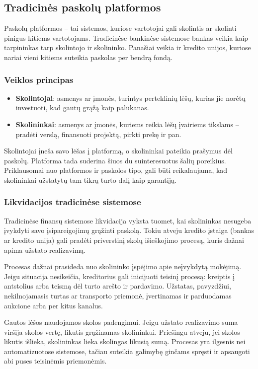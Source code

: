 \documentclass[]{VUMIFTemplateClass}
\begin{document}
\subsection{Tradicinės paskolų platformos}
Paskolų platformos – tai sistemos, kuriose vartotojai gali skolintis ar skolinti pinigus kitiems vartotojams. Tradicinėse bankinėse sistemose bankas veikia kaip tarpininkas tarp skolintojo ir skolininko. Panašiai veikia ir kredito unijos, kuriose nariai vieni kitiems suteikia paskolas per bendrą fondą.

\subsubsection{Veiklos principas}
\begin{itemize}
    \item \textbf{Skolintojai}: asmenys ar įmonės, turintys perteklinių lėšų, kurias jie norėtų investuoti, kad gautų grąžą kaip palūkanas.
    \item \textbf{Skolininkai}: asmenys ar įmonės, kuriems reikia lėšų įvairiems tikslams – pradėti verslą, finansuoti projektą, pirkti prekę ir pan.
\end{itemize}

Skolintojai įneša savo lėšas į platformą, o skolininkai pateikia prašymus dėl paskolų. Platforma tada suderina šiuos du suinteresuotus šalių poreikius. Priklausomai nuo platformos ir paskolos tipo, gali būti reikalaujama, kad skolininkai užstatytų tam tikrą turto dalį kaip garantiją.

\subsubsection{Likvidacijos tradicinėse sistemose}
Tradicinėse finansų sistemose likvidacija vyksta tuomet, kai skolininkas nesugeba įvykdyti savo įsipareigojimų grąžinti paskolą. Tokiu atveju kredito įstaiga (bankas ar kredito unija) gali pradėti priverstinį skolų išieškojimo procesą, kuris dažnai apima užstato realizavimą.

Procesas dažnai prasideda nuo skolininko įspėjimo apie neįvykdytą mokėjimą. Jeigu situacija nesikeičia, kreditorius gali inicijuoti teisinį procesą: kreiptis į antstolius arba teismą dėl turto arešto ir pardavimo. Užstatas, pavyzdžiui, nekilnojamasis turtas ar transporto priemonė, įvertinamas ir parduodamas aukcione arba per kitus kanalus.

Gautos lėšos naudojamos skolos padengimui. Jeigu užstato realizavimo suma viršija skolos vertę, likutis grąžinamas skolininkui. Priešingu atveju, jei skolos likutis išlieka, skolininkas lieka skolingas likusią sumą. Procesas yra ilgesnis nei automatizuotose sistemose, tačiau suteikia galimybę ginčams spręsti ir apsaugoti abi puses teisinėmis priemonėmis.
\end{document}
